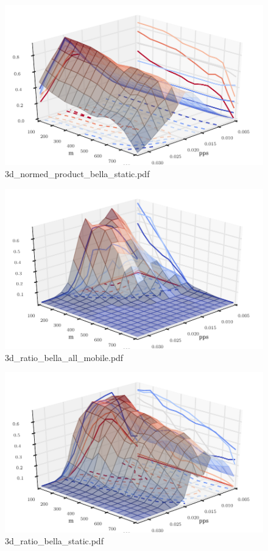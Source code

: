 \documentclass{article}
\begin{document}
\begin{figure}[h!]
\centering
\includegraphics[width=\linewidth]{3d_normed_product_bella_static.pdf}
\caption{3d\_normed\_product\_bella\_static.pdf}
\end{figure}




\begin{figure}[h!]
\centering
\includegraphics[width=\linewidth]{3d_ratio_bella_all_mobile.pdf}
\caption{3d\_ratio\_bella\_all\_mobile.pdf}
\end{figure}




\begin{figure}[h!]
\centering
\includegraphics[width=\linewidth]{3d_ratio_bella_static.pdf}
\caption{3d\_ratio\_bella\_static.pdf}
\end{figure}
\end{document}
